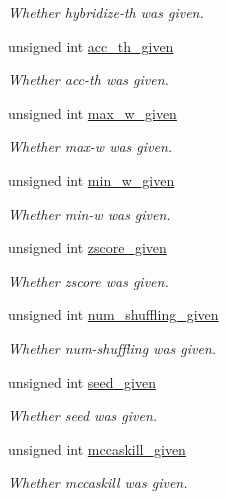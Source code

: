 \begin{DoxyCompactItemize}
\begin{DoxyCompactList}\small\item\em Whether hybridize-\/th was given. \end{DoxyCompactList}\item 
unsigned int \hyperlink{structgengetopt__args__info_aceb5489e00facac0f7469af450fecc5f}{acc\+\_\+th\+\_\+given}
\begin{DoxyCompactList}\small\item\em Whether acc-\/th was given. \end{DoxyCompactList}\item 
unsigned int \hyperlink{structgengetopt__args__info_aa982c2dc155c088dfd006708ce04c5ed}{max\+\_\+w\+\_\+given}
\begin{DoxyCompactList}\small\item\em Whether max-\/w was given. \end{DoxyCompactList}\item 
unsigned int \hyperlink{structgengetopt__args__info_aeb19a366901b0fa59385722ed8c69747}{min\+\_\+w\+\_\+given}
\begin{DoxyCompactList}\small\item\em Whether min-\/w was given. \end{DoxyCompactList}\item 
unsigned int \hyperlink{structgengetopt__args__info_ae7d88b70fcb65c4b63f1f026c8cfa47e}{zscore\+\_\+given}
\begin{DoxyCompactList}\small\item\em Whether zscore was given. \end{DoxyCompactList}\item 
unsigned int \hyperlink{structgengetopt__args__info_a39aafdd42c0bbbd0cf11b6e6506aa6fe}{num\+\_\+shuffling\+\_\+given}
\begin{DoxyCompactList}\small\item\em Whether num-\/shuffling was given. \end{DoxyCompactList}\item 
unsigned int \hyperlink{structgengetopt__args__info_a5628cfc09082e40b5e095f52c05098ac}{seed\+\_\+given}
\begin{DoxyCompactList}\small\item\em Whether seed was given. \end{DoxyCompactList}\item 
unsigned int \hyperlink{structgengetopt__args__info_abdb41a52bf90de52d706f3a4b768fff1}{mccaskill\+\_\+given}
\begin{DoxyCompactList}\small\item\em Whether mccaskill was given. \end{DoxyCompactList}\item 

\end{DoxyCompactItemize}
